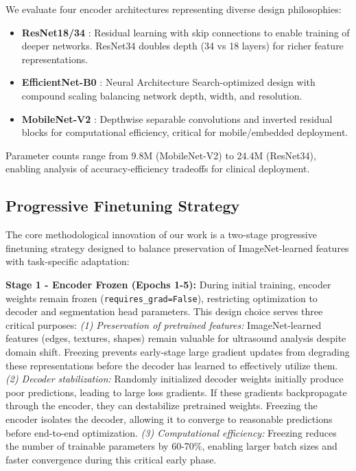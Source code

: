 \documentclass{article}
\begin{document}
We evaluate four encoder architectures representing diverse design philosophies:

\begin{itemize}
    \item \textbf{ResNet18/34} \cite{ref13}: Residual learning with skip connections to enable training of deeper networks. ResNet34 doubles depth (34 vs 18 layers) for richer feature representations.
    \item \textbf{EfficientNet-B0} \cite{ref14}: Neural Architecture Search-optimized design with compound scaling balancing network depth, width, and resolution.
    \item \textbf{MobileNet-V2} \cite{ref15}: Depthwise separable convolutions and inverted residual blocks for computational efficiency, critical for mobile/embedded deployment.
\end{itemize}

Parameter counts range from 9.8M (MobileNet-V2) to 24.4M (ResNet34), enabling analysis of accuracy-efficiency tradeoffs for clinical deployment.

\subsection{Progressive Finetuning Strategy}

The core methodological innovation of our work is a two-stage progressive finetuning strategy designed to balance preservation of ImageNet-learned features with task-specific adaptation:

\textbf{Stage 1 - Encoder Frozen (Epochs 1-5):}
During initial training, encoder weights remain frozen (\texttt{requires\_grad=False}), restricting optimization to decoder and segmentation head parameters. This design choice serves three critical purposes: \textit{(1) Preservation of pretrained features:} ImageNet-learned features (edges, textures, shapes) remain valuable for ultrasound analysis despite domain shift. Freezing prevents early-stage large gradient updates from degrading these representations before the decoder has learned to effectively utilize them. \textit{(2) Decoder stabilization:} Randomly initialized decoder weights initially produce poor predictions, leading to large loss gradients. If these gradients backpropagate through the encoder, they can destabilize pretrained weights. Freezing the encoder isolates the decoder, allowing it to converge to reasonable predictions before end-to-end optimization. \textit{(3) Computational efficiency:} Freezing reduces the number of trainable parameters by 60-70\%, enabling larger batch sizes and faster convergence during this critical early phase.
\end{document}
